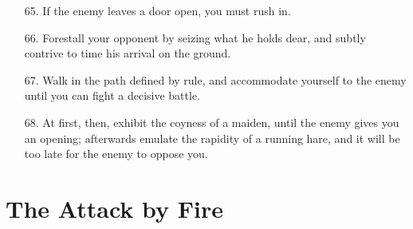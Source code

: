 \documentclass[11pt,openany]{memoir}
\newcommand{\enumeratemargin}{1.30em}
\begin{document}
\begin{enumerate}[leftmargin=\enumeratemargin]
\item[65.] If the enemy leaves a door open, you must rush in.
\item[66.] Forestall your opponent by seizing what he holds dear, and subtly contrive to time his arrival on the ground.
\item[67.] Walk in the path defined by rule, and accommodate yourself to the enemy until you can fight a decisive battle.
\item[68.] At first, then, exhibit the coyness of a maiden, until the enemy gives you an opening; afterwards emulate the rapidity of a running hare, and it will be too late for the enemy to oppose you.
\end{enumerate}

\chapter{The Attack by Fire}
\end{document}
